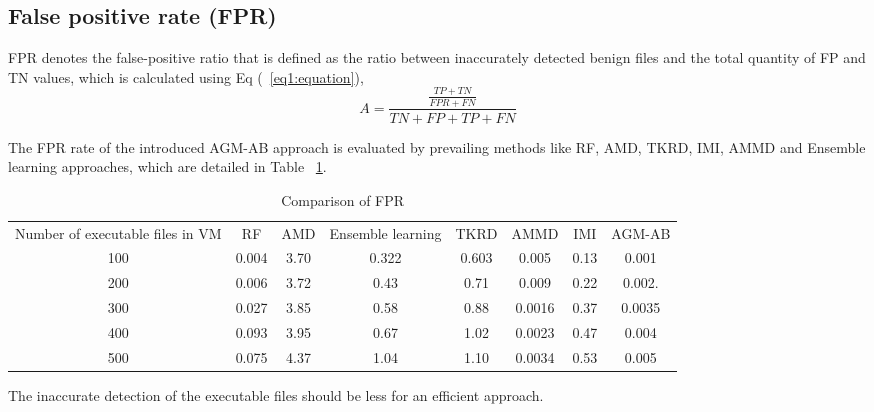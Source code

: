 \documentclass{gji}
\begin{document}
\subsection{False positive rate (FPR)}
\par FPR denotes the false-positive ratio that is defined as the ratio between inaccurately detected benign files and the total quantity of FP and TN values, which is calculated using Eq (~\ref{eq1:equation}),
\begin{equation}
A = \frac{\frac{TP+TN}{FPR+FN}}{TN+FP+TP+FN}
\label{eq1:equation}
\end{equation}
\par The FPR rate of the introduced AGM-AB approach is evaluated by prevailing methods like RF, AMD, TKRD, IMI, AMMD and Ensemble learning approaches, which are detailed in Table ~\ref{tab:freq2}.
\begin{table}
  \caption{Comparison of FPR}
  \label{tab:freq2}
  \begin{tabular}{cccccccc}
    Number of executable files in VM&RF&AMD&Ensemble learning&TKRD&AMMD&IMI&AGM-AB\\
       100& 0.004	&3.70	&0.322&	0.603&	0.005&	0.13&	0.001\\
       200&	0.006&	3.72	&0.43	&0.71&0.009	&0.22&	0.002.\\
        300&	0.027&	3.85&	0.58	&0.88	&0.0016&	0.37	&0.0035\\
       400&	0.093&	3.95&	0.67&	1.02&	0.0023&	0.47&	0.004\\
       500&	0.075&	4.37&	1.04&	1.10&	0.0034&	0.53&	0.005\\
\end{tabular}
\end{table}
The inaccurate detection of the executable files should be less for an efficient approach.
\end{document}
